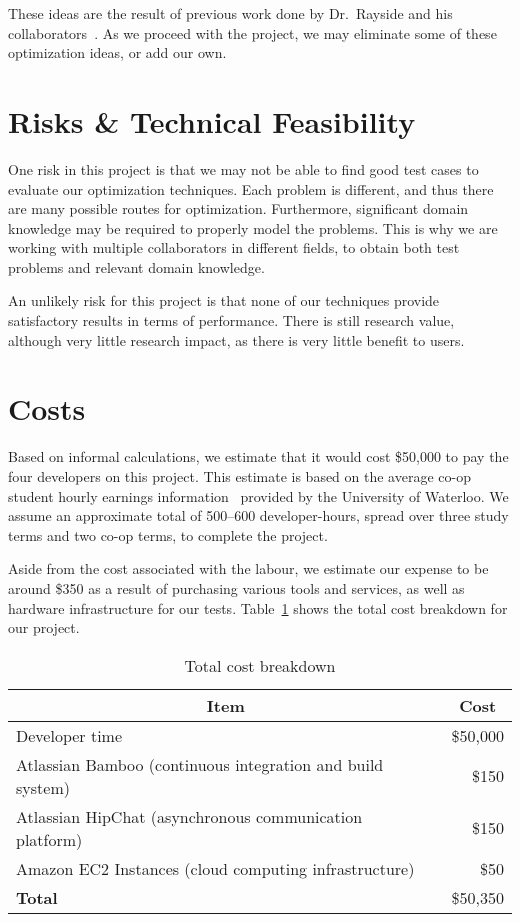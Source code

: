 \documentclass[11pt]{article}
\begin{document}
These ideas are the result of previous work done by Dr.\ Rayside and
his collaborators~\cite{ref:Kovacevic11}. As we proceed with the
project, we may eliminate some of these optimization ideas, or add our
own.

\section{Risks \& Technical Feasibility}\label{sec:risks}
One risk in this project is that we may not be able to find good test
cases to evaluate our optimization techniques. Each problem is
different, and thus there are many possible routes for optimization.
Furthermore, significant domain knowledge may be required to properly
model the problems. This is why we are working with multiple
collaborators in different fields, to obtain both test problems and
relevant domain knowledge.

An unlikely risk for this project is that none of our techniques
provide satisfactory results in terms of performance. There is still
research value, although very little research impact, as there is very
little benefit to users.

\section{Costs}\label{sec:costs}
Based on informal calculations, we estimate that it would cost \$50,000
to pay the four developers on this project. This estimate is based on
the average co-op student hourly earnings information~\cite{ref:ceca}
provided by the University of Waterloo. We assume an approximate total
of 500--600 developer-hours, spread over three study terms and two
co-op terms, to complete the project.

Aside from the cost associated with the labour, we estimate our expense
to be around \$350 as a result of purchasing various tools and
services, as well as hardware infrastructure for our tests.
Table~\ref{tbl:costbreakdown} shows the total cost breakdown for our
project.

\begin{table}[H]
  \captionsetup{margin=30pt}
  \caption{Total cost breakdown}\label{tbl:costbreakdown}
  \centering
  \begin{tabular}{lr}
    \hline
    \multicolumn{1}{c}{\textbf{Item}} &
    \multicolumn{1}{c}{\textbf{Cost}} \\
    \hline
      Developer time & \$50,000 \\
      Atlassian Bamboo (continuous integration and build system)~\cite{ref:bamboo} & \$150 \\
      Atlassian HipChat (asynchronous communication platform)~\cite{ref:hipchat} & \$150 \\
      Amazon EC2 Instances (cloud computing infrastructure)~\cite{ref:ec2} & \$50 \\
    \hline
    \textbf{Total} & \$50,350 \\
    \hline
  \end{tabular}
\end{table}
\end{document}
